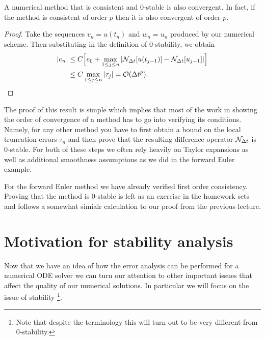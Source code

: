 \begin{theorem}\label{thm:lax-equivalence}
    A numerical method that is consistent and $0$-stable 
    is also convergent. In fact, if the method is 
    consistent of order $p$ then it is also convergent 
    of order $p$.
\end{theorem}

\begin{proof}
    Take the sequences $v_n = u(t_n)$ and $ w_n = u_n$ produced 
    by our numerical scheme. Then substituting in the 
    definition of $0$-stability, we obtain 
    \begin{equation*}
        \begin{aligned}
        |e_n| & \le C \Big[ e_0 + \max_{1 \le j \le n} | \mathcal{N}_{\Delta t}[u(t_{j-1})] - 
        \mathcal{N}_{\Delta t}[u_{j-1}]| \Big] \\ 
        & \le C \max_{1 \le j \le n} | \tau_j | = \mathcal{O}(\Delta t^p).
        \end{aligned}
    \end{equation*}
\end{proof}
The proof of this result is simple which implies that most of 
the work in showing the order of convergence of a method 
has to go into verifying its conditions. Namely, for any 
other method you have to first obtain a bound on the 
local truncation errors $\tau_n$ and then prove that the 
resulting difference operator $\mathcal{N}_{\Delta t}$ is $0$-stable. 
For both of these steps we often rely heavily on Taylor expansions 
as well as additional smoothness assumptions as we 
did in the forward Euler example.

For the forward Euler method we have already verified first order 
consistency. Proving that the method is $0$-stable is left as an exercise 
in the homework sets and follows a somewhat simialr calculation to 
our proof from the previous lecture.

\section{Motivation for stability analysis}

Now that we have an idea of how the error analysis can be performed 
for a numerical ODE solver we can turn our attention to 
other important issues that affect the quality of our numerical 
solutions. In particular we will focus on the issue of stability 
\footnote{Note that despite the terminology this will turn out 
to be very different from $0$-stability.}. 

